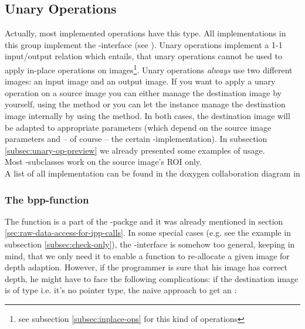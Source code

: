 \subsection{Unary Operations\label{subsec:unary-ops}}
Actually, most implemented operations have this type. All implementations in this group implement the -interface (see ). Unary operations implement a 1-1 input/output relation which entails, that unary operations cannot be used to apply in-place operations on images\footnote{see subsection \ref{subsec:inplace-ops} for this kind of operations}. Unary operations \emph{always} use two different images: an input image and an output image. If you want to apply a unary operation on a source image you can either manage the destination image by yourself, using the 
method or you can let the  instance manage the destination image internally by using the 
method. In both cases, the destination image will be adapted to appropriate parameters (which depend on the source image parameters and -- of course -- the certain -implementation). In subsection \ref{subsec:unary-op-preview} we already presented some examples of  usage.\\
Most -subclasses work on the source image's ROI only.\\

A list of all  implementation can be found in the doxygen collaboration diagram in 

\subsubsection{The bpp-function\label{subsec:bpp}}
The  function is a part of the -packge and it was already mentioned in section \ref{sec:raw-data-access-for-ipp-calls}. In some special cases (e.g. see the example in subsection \ref{subsec:check-only}), the -interface is somehow too general, keeping in mind, that we only need it to enable a function to re-allocate a given image for depth adaption. However, if the programmer is sure that his image has correct depth, he might have to face the following complications: if the destination image is of type  i.e. it's no pointer type, the naive approach to get an :

